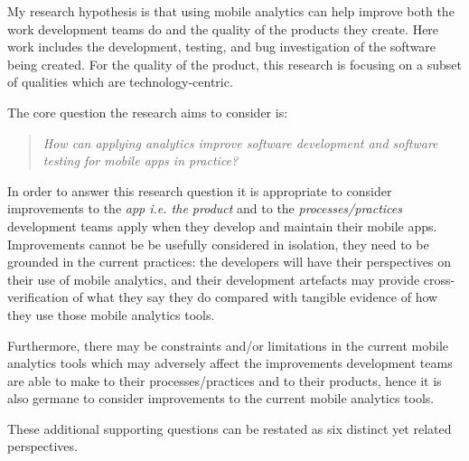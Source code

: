 

My research hypothesis is that using mobile analytics can help improve both the work development teams do and the quality of the products they create. Here work includes the development, testing, and bug investigation of the software being created. For the quality of the product, this research is focusing on a subset of qualities which are technology-centric.

The core question the research aims to consider is:
\begin{quote}
  \emph{How can applying analytics improve software development and software testing for mobile apps in practice?}~\label{overall-research-question}  
\end{quote}

In order to answer this research question it is appropriate to consider improvements to the \emph{app i.e. the product} and to the \emph{processes/practices} development teams apply when they develop and maintain their mobile apps. Improvements cannot be be usefully considered in isolation, they need to be grounded in the current practices: the developers will have their perspectives on their use of mobile analytics, and their development artefacts may provide cross-verification of what they say they do compared with tangible evidence of how they use those mobile analytics tools. 

Furthermore, there may be constraints and/or limitations in the current mobile analytics tools which may adversely affect the improvements development teams are able to make to their processes/practices and to their products, hence it is also germane to consider improvements to the current mobile analytics tools.

These additional supporting questions can be restated as six distinct yet related perspectives.

